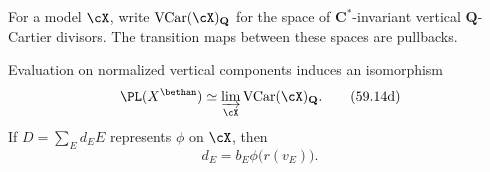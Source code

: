 For a model $\cX$, write
$\operatorname{VCar}(\cX)_{\mathbf Q}$ for the space of
$\mathbf C^*$-invariant vertical $\mathbf Q$-Cartier divisors.
The transition maps between these spaces are pullbacks.

\par\noindent\begin{minipage}{\linewidth}
\begin{proposition}\label{prop:mp-pl-vcar}
Evaluation on normalized vertical components induces an isomorphism
\[
 \PL(X^{\bethan})
      \simeq
 \varinjlim_{\cX}\operatorname{VCar}(\cX)_{\mathbf Q}.
\tag{59.14d}\label{eq:mp-pl-vcar}
\]
If $D=\sum_E d_EE$ represents $\phi$ on $\cX$, then
\[
                         d_E=b_E\phi\bigl(r(v_E)\bigr).
\tag{59.14e}\label{eq:mp-vcar-coefficients}
\]
\end{proposition}
\end{minipage}\par

